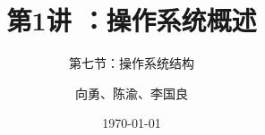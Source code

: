 


\title[第1讲]{第1讲 ：操作系统概述} %
\subtitle{第七节：操作系统结构}
\author{向勇、陈渝、李国良} %
\date{\today} %



\begin{frame}
\titlepage %
\end{frame}

%
%

